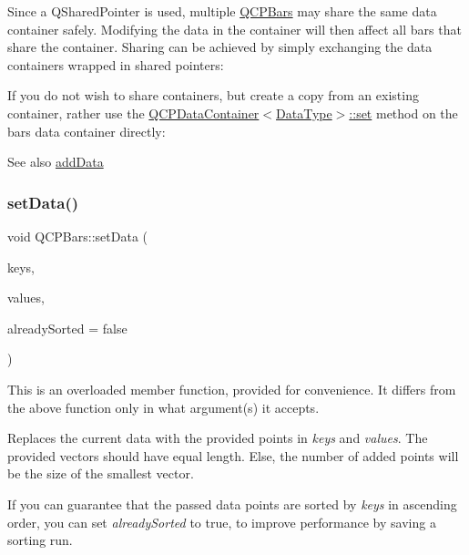 Since a Q\+Shared\+Pointer is used, multiple \mbox{\hyperlink{class_q_c_p_bars}{Q\+C\+P\+Bars}} may share the same data container safely. Modifying the data in the container will then affect all bars that share the container. Sharing can be achieved by simply exchanging the data containers wrapped in shared pointers\+: 
\begin{DoxyCodeInclude}
\end{DoxyCodeInclude}
 If you do not wish to share containers, but create a copy from an existing container, rather use the \mbox{\hyperlink{class_q_c_p_data_container_ae7042bd534fc3ce7befa2ce3f790b5bf}{Q\+C\+P\+Data\+Container$<$\+Data\+Type$>$\+::set}} method on the bar\textquotesingle{}s data container directly\+: 
\begin{DoxyCodeInclude}
\end{DoxyCodeInclude}
 \begin{DoxySeeAlso}{See also}
\mbox{\hyperlink{class_q_c_p_bars_a323d6970d6d6e3166d89916a7f60f733}{add\+Data}} 
\end{DoxySeeAlso}
\mbox{\label{class_q_c_p_bars_a2a88cd5b16ec7b71e5a590f95b50c5ce}} 
\subsubsection{\texorpdfstring{set\+Data()}{setData()}\hspace{0.1cm}{\footnotesize\ttfamily [2/2]}}
{\footnotesize\ttfamily void Q\+C\+P\+Bars\+::set\+Data (\begin{DoxyParamCaption}\item[{const Q\+Vector$<$ double $>$ \&}]{keys,  }\item[{const Q\+Vector$<$ double $>$ \&}]{values,  }\item[{bool}]{already\+Sorted = {\ttfamily false} }\end{DoxyParamCaption})}

This is an overloaded member function, provided for convenience. It differs from the above function only in what argument(s) it accepts.

Replaces the current data with the provided points in {\itshape keys} and {\itshape values}. The provided vectors should have equal length. Else, the number of added points will be the size of the smallest vector.

If you can guarantee that the passed data points are sorted by {\itshape keys} in ascending order, you can set {\itshape already\+Sorted} to true, to improve performance by saving a sorting run.

